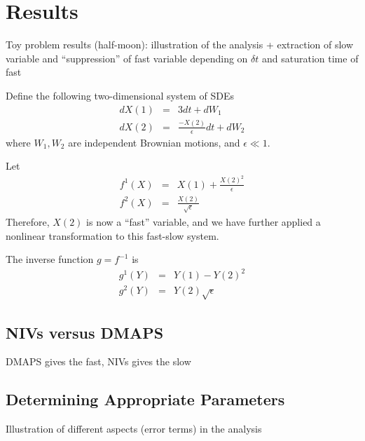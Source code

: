 \documentclass[1p]{elsarticle}
\begin{document}
\section{Results}

 Toy problem results (half-moon): illustration of the analysis + extraction of slow variable and ``suppression'' of fast variable depending on $\delta t$ and saturation time of fast
 
 Define the following two-dimensional system of SDEs
\begin{eqnarray}
dX(1) &=& 3 dt + dW_1 \\ 
dX(2) &=& \frac{-X(2)}{\epsilon} dt + dW_2 
\end{eqnarray}
where $W_1, W_2$ are independent Brownian motions, and $\epsilon \ll 1$.

Let
\begin{eqnarray}
f^1(X) &=& X(1) + \frac{ X(2)^2}{\epsilon} \\
f^2(X) &=& \frac{X(2)}{\sqrt{\epsilon}}
\end{eqnarray}
Therefore, $X(2)$ is now a ``fast'' variable, and we have further applied a nonlinear transformation to this fast-slow system. 

The inverse function $g = f^{-1}$ is
\begin{eqnarray}
g^1(Y) &=& Y(1) - Y(2)^2 \\
g^2(Y) &=& Y(2) \sqrt{\epsilon}
\end{eqnarray}


 
\subsection{NIVs versus DMAPS}

DMAPS gives the fast, NIVs gives the slow 

\subsection{Determining Appropriate Parameters}

Illustration of different aspects (error terms) in the analysis
\end{document}
